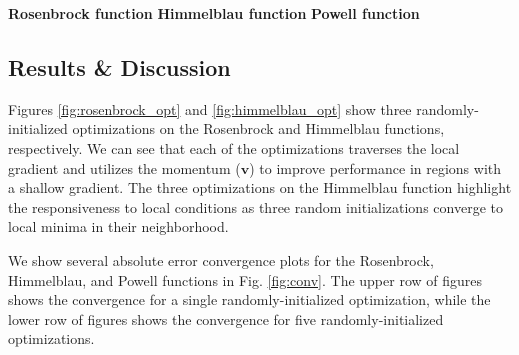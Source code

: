 \documentclass[conference]{IEEEtran}
\begin{document}
\begin{figure*}
    
    \hspace*{0.73in} \textbf{Rosenbrock function} \hspace*{1.03in} \textbf{Himmelblau function} \hspace*{1.16 in} \textbf{Powell function} \vspace*{0.05 in}
    
    \hfill
     
    \hfill
     
    \hfill
    
    \hfill
    
    \vspace{0.05in}
    
    \hfill
     
    \hfill
     
    \hfill
    
    \hfill
    
    \caption{Convergence of the absolute error in optimizing the Rosenbrock function (\textit{left}), the Himmelblau function (\textit{center}), and the Powell function (\textit{right}). The upper figures depict a single randomly-initialized optimization and the lower figures depict a series of five randomly-initialized optimizations, demonstrating consistency in the convergence to a global minimum.}
    \label{fig:conv}
\end{figure*}

\subsection{Results \& Discussion}
Figures \ref{fig:rosenbrock_opt} and \ref{fig:himmelblau_opt} show three randomly-initialized optimizations on the Rosenbrock and Himmelblau functions, respectively. We can see that each of the optimizations traverses the local gradient and utilizes the momentum ($\textbf{v}$) to improve performance in regions with a shallow gradient. The three optimizations on the Himmelblau function highlight the responsiveness to local conditions as three random initializations converge to local minima in their neighborhood.

We show several absolute error convergence plots for the Rosenbrock, Himmelblau, and Powell functions in Fig. \ref{fig:conv}. The upper row of figures shows the convergence for a single randomly-initialized optimization, while the lower row of figures shows the convergence for five randomly-initialized optimizations. 
\end{document}
